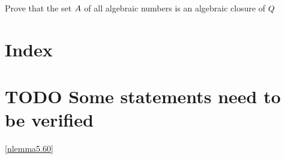 \documentclass[11pt]{article}
\begin{document}
\begin{exercise}
\label{nex5.46}
Prove that the set \(\relax{A}\) of all algebraic numbers is an algebraic closure of \(\relax{Q}\)
\end{exercise}
\section{Index}
\label{sec:org78ea478}
\renewcommand{\indexname}{}
\printindex
\section{{\bfseries\sffamily TODO} Some statements need to be verified}
\label{sec:orga4289bf}
\ref{nlemma5.60}
\end{document}
